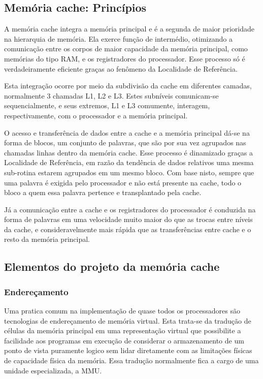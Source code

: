 \documentclass[12pt]{article}
\begin{document}
\subsection{Memória cache: Princípios}
A memória cache integra a memória principal e é a segunda de maior prioridade na hierarquia de memória. Ela exerce função de intermédio, otimizando a comunicação entre os corpos de maior capacidade da memória principal, como memórias do tipo RAM, e os registradores do processador. Esse processo só é verdadeiramente eficiente graças ao fenômeno da Localidade de Referência. 

Esta integração ocorre por meio da subdivisão da cache em diferentes camadas, normalmente 3 chamadas L1, L2 e L3. Estes subníveis comunicam-se sequencialmente, e seus extremos, L1 e L3 comumente, interagem, respectivamente, com o processador e a memória principal. 

O acesso e transferência de dados entre a cache e a memória principal dá-se na forma de blocos, um conjunto de palavras, que são por sua vez agrupados nas chamadas linhas dentro da memória cache. Esse processo é dinamizado graças a Localidade de Referência, em razão da tendência de dados relativos uma mesma sub-rotina estarem agrupados em um mesmo bloco. Com base nisto, sempre que uma palavra é exigida pelo processador e não está presente na cache, todo o bloco a quem essa palavra pertence e transplantado pela cache. 

Já a comunicação entre a cache e os registradores do processador é conduzida na forma de palavras em uma velocidade muito maior do que as trocas entre níveis da cache, e consideravelmente mais rápida que as transferências entre cache e o resto da memória principal.
\subsection{Elementos do projeto da memória cache}
\subsubsection*{Endereçamento}
Uma pratica comum na implementação de quase todos os processadores são tecnologias de endereçamento de memória virtual. Esta trata-se da tradução de células da memória principal em uma representação virtual que possibilite a facilidade aos programas em execução de considerar o armazenamento de um ponto de vista puramente logico sem lidar diretamente com as limitações físicas de capacidade física da memória. Essa tradução normalmente fica a cargo de uma unidade especializada, a MMU.
\end{document}
